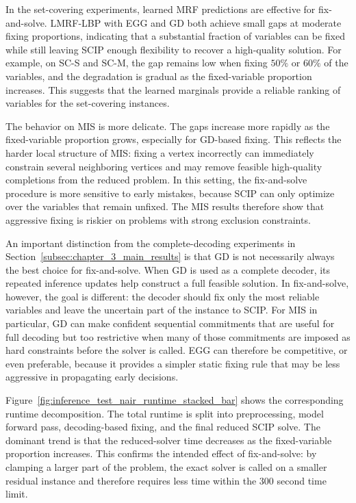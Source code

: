 In the set-covering experiments, learned MRF predictions are effective for fix-and-solve. LMRF-LBP with EGG and GD both achieve small gaps at moderate fixing proportions, indicating that a substantial fraction of variables can be fixed while still leaving SCIP enough flexibility to recover a high-quality solution. For example, on SC-S and SC-M, the gap remains low when fixing $50\%$ or $60\%$ of the variables, and the degradation is gradual as the fixed-variable proportion increases. This suggests that the learned marginals provide a reliable ranking of variables for the set-covering instances.

The behavior on MIS is more delicate. The gaps increase more rapidly as the fixed-variable proportion grows, especially for GD-based fixing. This reflects the harder local structure of MIS: fixing a vertex incorrectly can immediately constrain several neighboring vertices and may remove feasible high-quality completions from the reduced problem. In this setting, the fix-and-solve procedure is more sensitive to early mistakes, because SCIP can only optimize over the variables that remain unfixed. The MIS results therefore show that aggressive fixing is riskier on problems with strong exclusion constraints.

An important distinction from the complete-decoding experiments in Section~\ref{subsec:chapter_3_main_results} is that GD is not necessarily always the best choice for fix-and-solve. When GD is used as a complete decoder, its repeated inference updates help construct a full feasible solution. In fix-and-solve, however, the goal is different: the decoder should fix only the most reliable variables and leave the uncertain part of the instance to SCIP. For MIS in particular, GD can make confident sequential commitments that are useful for full decoding but too restrictive when many of those commitments are imposed as hard constraints before the solver is called. EGG can therefore be competitive, or even preferable, because it provides a simpler static fixing rule that may be less aggressive in propagating early decisions.



Figure~\ref{fig:inference_test_nair_runtime_stacked_bar} shows the corresponding runtime decomposition. The total runtime is split into preprocessing, model forward pass, decoding-based fixing, and the final reduced SCIP solve. The dominant trend is that the reduced-solver time decreases as the fixed-variable proportion increases. This confirms the intended effect of fix-and-solve: by clamping a larger part of the problem, the exact solver is called on a smaller residual instance and therefore requires less time within the $300$ second time limit.

